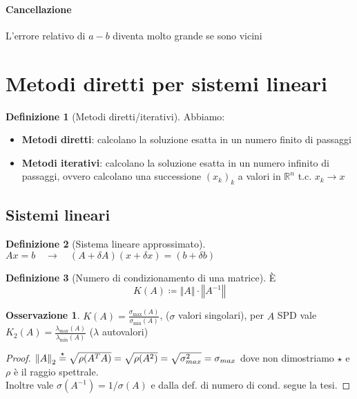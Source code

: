 \documentclass[a4paper,10pt]{article}
\theoremstyle{definition}
\newcommand{\re}{\mathbb{R}} %
\theoremstyle{indentdefinition}
\newtheorem{defn}{Definizione}[section]
\theoremstyle{indenttheorem}
\theoremstyle{myremark}
\newtheorem*{rem*}{Osservazione}
\theoremstyle{indentgeneral}
\theoremstyle{plain}
\theoremstyle{plain}
\newenvironment{myboxed} 
{\noindent\begin{lrbox}{\mybox}\begin{minipage}{\textwidth}}
{\end{minipage}\end{lrbox}\fbox{\usebox{\mybox}}}
\begin{document}
\paragraph{Cancellazione} L'errore relativo di $a-b$ diventa molto grande se sono vicini



\pagebreak{}

\section{Metodi diretti per sistemi lineari}
\begin{defn}[Metodi diretti/iterativi] Abbiamo:
\begin{itemize}
    \item \textbf{Metodi diretti}: calcolano la soluzione esatta in un numero finito di passaggi
    \item \textbf{Metodi iterativi}: calcolano la soluzione esatta in un numero infinito di passaggi, ovvero calcolano una successione $(x_k)_k$ a valori in $\re^n$ t.c. $x_k\to x$
\end{itemize}
    
\end{defn}
\subsection{Sistemi lineari}
\begin{defn}[Sistema lineare approssimato]
\label{def:sistema-lineare-approssimato}$Ax=b\quad\longrightarrow\quad\left(A+\delta A\right)\left(x+\delta x\right)=\left(b+\delta b\right)$
\end{defn}

\begin{defn}[Numero di condizionamento di una matrice]
    È $$K\left(A\right)\coloneqq\left\Vert A\right\Vert \cdot\left\Vert A^{-1}\right\Vert $$
\end{defn}

\begin{myboxed}
\begin{rem*}
$K\left(A\right)=\frac{\sigma_{\max}\left(A\right)}{\sigma_{\min}\left(A\right)} $, ($\sigma$ valori singolari),
per $A$ SPD vale $K_{2}\left(A\right)=\frac{\lambda_{\max}\left(A\right)}{\lambda_{\min}\left(A\right)}$ ($\lambda$ autovalori)
\end{rem*}
\end{myboxed}
\begin{proof}
    $\norm{A}_2\overset{\star}{=}\sqrt{\rho(A^TA)}=\sqrt{\rho(A^2)}=\sqrt{\sigma_{max}^2}=\sigma_{max}$ dove non dimostriamo $\star$ e $\rho$ è il raggio spettrale. \\
    Inoltre vale $\sigma(A^{-1})=1/\sigma(A)$ e dalla def. di numero di cond. segue la tesi.
\end{proof}
\end{document}
